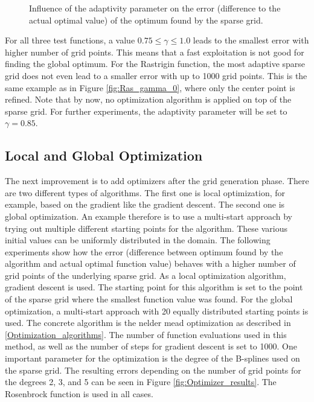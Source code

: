 \begin{figure}[H]
	\caption{ Influence of the adaptivity parameter on the error (difference to the actual optimal value) of the optimum found by the sparse grid. }	
	\label{fig:Functions_results}
\end{figure}

For all three test functions, a value $ 0.75 \le \gamma \le 1.0 $ leads to the smallest error with higher number of grid points. This means that a fast exploitation is not good for finding the global optimum. For the Rastrigin function, the most adaptive sparse grid does not even lead to a smaller error with up to 1000 grid points. This is the same example as in Figure \ref{fig:Ras_gamma_0}, where only the center point is refined. Note that by now, no optimization algorithm is applied on top of the sparse grid. For further experiments, the adaptivity parameter will be set to $ \gamma = 0.85 $. \newline 

\subsection{Local and Global Optimization}

The next improvement is to add optimizers after the grid generation phase. There are two different types of algorithms. The first one is local optimization, for example, based on the gradient like the gradient descent. The second one is global optimization. An example therefore is to use a multi-start approach by trying out multiple different starting points for the algorithm. These various initial values can be uniformly distributed in the domain. The following experiments show how the error (difference between optimum found by the algorithm and actual optimal function value) behaves with a higher number of grid points of the underlying sparse grid. As a local optimization algorithm, gradient descent is used. The starting point for this algorithm is set to the point of the sparse grid where the smallest function value was found. For the global optimization, a multi-start approach with 20 equally distributed starting points is used. The concrete algorithm is the nelder mead optimization as described in \ref{Optimization_algorithms}. The number of function evaluations used in this method, as well as the number of steps for gradient descent is set to 1000. One important parameter for the optimization is the degree of the B-splines used on the sparse grid. The resulting errors depending on the number of grid points for the degrees 2, 3, and 5 can be seen in Figure \ref{fig:Optimizer_results}. The Rosenbrock function is used in all cases.

